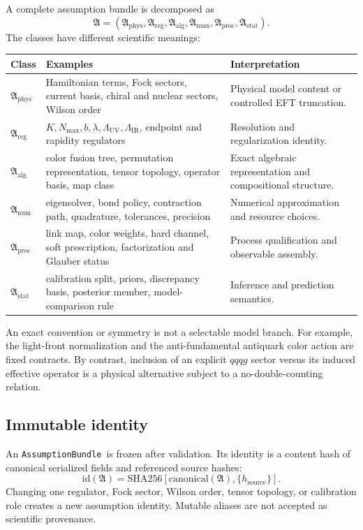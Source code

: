 \documentclass[11pt]{article}
\newcommand{\phys}{\mathrm{phys}}
\newcommand{\reg}{\mathrm{reg}}
\newcommand{\num}{\mathrm{num}}
\newcommand{\proc}{\mathrm{proc}}
\newcommand{\stat}{\mathrm{stat}}
\newcommand{\UV}{\mathrm{UV}}
\newcommand{\IR}{\mathrm{IR}}
\newcommand{\Aset}{\mathfrak A}
\newcommand{\AssumptionBundle}{\texttt{AssumptionBundle}}
\begin{document}
A complete assumption bundle is decomposed as
\begin{equation}
 \Aset=
 \left(
 \Aset_{\phys},
 \Aset_{\reg},
 \Aset_{\mathrm{alg}},
 \Aset_{\num},
 \Aset_{\proc},
 \Aset_{\stat}
 \right).
\label{eq:assumption-decomposition}
\end{equation}
The classes have different scientific meanings:
\begin{longtable}{L{0.17\textwidth}L{0.34\textwidth}L{0.39\textwidth}}
\toprule
Class & Examples & Interpretation\\
\midrule
\endhead
\(\Aset_{\phys}\) & Hamiltonian terms, Fock sectors, current basis, chiral and nuclear sectors, Wilson order & Physical model content or controlled EFT truncation.\\
\(\Aset_{\reg}\) & \(K,N_{\max},b,\lambda,\Lambda_{\UV},\Lambda_{\IR}\), endpoint and rapidity regulators & Resolution and regularization identity.\\
\(\Aset_{\mathrm{alg}}\) & color fusion tree, permutation representation, tensor topology, operator basis, map class & Exact algebraic representation and compositional structure.\\
\(\Aset_{\num}\) & eigensolver, bond policy, contraction path, quadrature, tolerances, precision & Numerical approximation and resource choices.\\
\(\Aset_{\proc}\) & link map, color weights, hard channel, soft prescription, factorization and Glauber status & Process qualification and observable assembly.\\
\(\Aset_{\stat}\) & calibration split, priors, discrepancy basis, posterior member, model-comparison rule & Inference and prediction semantics.\\
\bottomrule
\end{longtable}

An exact convention or symmetry is not a selectable model branch.  For
example, the light-front normalization and the anti-fundamental antiquark
color action are fixed contracts.  By contrast, inclusion of an explicit
\(qqqg\) sector versus its induced effective operator is a physical alternative
subject to a no-double-counting relation.

\subsection{Immutable identity}

An \AssumptionBundle\ is frozen after validation.  Its identity is a content
hash of canonical serialized fields and referenced source hashes:
\begin{equation}
 \mathrm{id}(\Aset)
 =
 \mathrm{SHA256}
 \left[
 \mathrm{canonical}(\Aset),
 \{h_{\mathrm{source}}\}
 \right].
\label{eq:assumption-hash}
\end{equation}
Changing one regulator, Fock sector, Wilson order, tensor topology, or
calibration role creates a new assumption identity.  Mutable aliases are not
accepted as scientific provenance.
\end{document}
